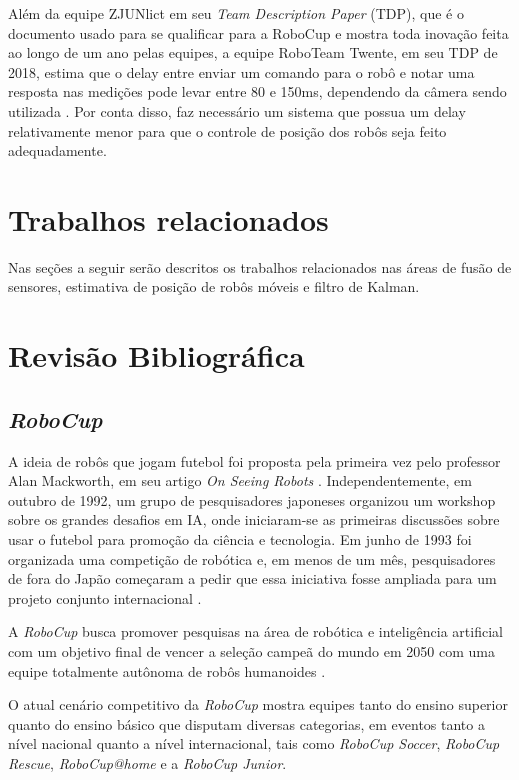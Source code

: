 \documentclass[acronym, symbols]{fei}
\begin{document}
		Além da equipe ZJUNlict em seu \textit{Team Description Paper} (TDP), que é o documento usado para se qualificar para a RoboCup e mostra toda inovação feita ao longo de um ano pelas equipes, a equipe RoboTeam Twente, em seu TDP de 2018, estima que o delay entre enviar um comando para o robô e notar uma resposta nas medições pode levar entre 80 e 150ms, dependendo da câmera sendo utilizada \cite{tdptwente2018}. Por conta disso, faz necessário um sistema que possua um delay relativamente menor para que o controle de posição dos robôs seja feito adequadamente. 
		
\chapter{Trabalhos relacionados}
	Nas seções a seguir serão descritos os trabalhos relacionados nas áreas de fusão de sensores, estimativa de posição de robôs móveis e filtro de Kalman.
		
\chapter{Revisão Bibliográfica}

	\section{\textit{RoboCup}}
	
		A ideia de robôs que jogam futebol foi proposta pela primeira vez pelo professor Alan Mackworth, em seu artigo \textit{On Seeing Robots} \cite{OnSeeingRobots}. Independentemente, em outubro de 1992, um grupo de pesquisadores japoneses organizou um workshop sobre os grandes desafios em IA, onde iniciaram-se as primeiras discussões sobre usar o futebol para promoção da ciência e tecnologia. Em junho de 1993 foi organizada uma competição de robótica e, em menos de um mês, pesquisadores de fora do Japão começaram a pedir que essa iniciativa fosse ampliada para um projeto conjunto internacional \cite{RoboCup}.
		
		A \textit{RoboCup} busca promover pesquisas na área de robótica e inteligência artificial com um objetivo final de vencer a seleção campeã do mundo em 2050 com uma equipe totalmente autônoma de robôs humanoides \cite{RoboCup}.
		
		O atual cenário competitivo da \textit{RoboCup} mostra equipes tanto do ensino superior quanto do ensino básico que disputam diversas categorias, em eventos tanto a nível nacional quanto a nível internacional, tais como \textit{RoboCup Soccer}, \textit{RoboCup Rescue}, \textit{RoboCup@home} e a \textit{RoboCup Junior}.
	
\end{document}
